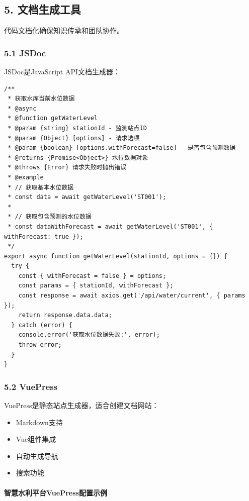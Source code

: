 \subsection{5. 文档生成工具}\label{ux6587ux6863ux751fux6210ux5de5ux5177}

代码文档化确保知识传承和团队协作。

\subsubsection{5.1 JSDoc}\label{jsdoc}

JSDoc是JavaScript API文档生成器：

\begin{lstlisting}
/**
 * 获取水库当前水位数据
 * @async
 * @function getWaterLevel
 * @param {string} stationId - 监测站点ID
 * @param {Object} [options] - 请求选项
 * @param {boolean} [options.withForecast=false] - 是否包含预测数据
 * @returns {Promise<Object>} 水位数据对象
 * @throws {Error} 请求失败时抛出错误
 * @example
 * // 获取基本水位数据
 * const data = await getWaterLevel('ST001');
 * 
 * // 获取包含预测的水位数据
 * const dataWithForecast = await getWaterLevel('ST001', { withForecast: true });
 */
export async function getWaterLevel(stationId, options = {}) {
  try {
    const { withForecast = false } = options;
    const params = { stationId, withForecast };
    const response = await axios.get('/api/water/current', { params });
    return response.data.data;
  } catch (error) {
    console.error('获取水位数据失败:', error);
    throw error;
  }
}
\end{lstlisting}

\subsubsection{5.2 VuePress}\label{vuepress}

VuePress是静态站点生成器，适合创建文档网站：

\begin{itemize}
\tightlist
\item
  Markdown支持
\item
  Vue组件集成
\item
  自动生成导航
\item
  搜索功能
\end{itemize}

\paragraph{智慧水利平台VuePress配置示例}\label{ux667aux6167ux6c34ux5229ux5e73ux53f0vuepressux914dux7f6eux793aux4f8b}

